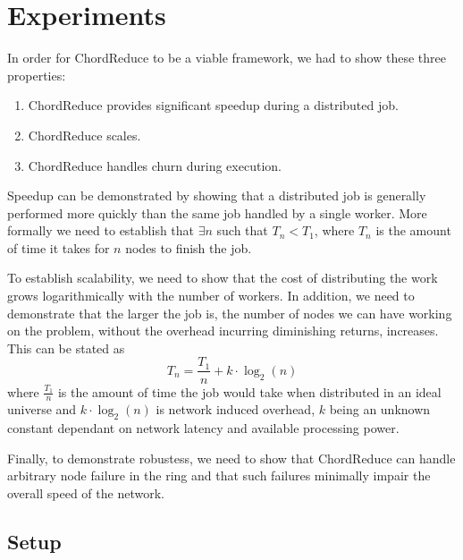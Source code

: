 \documentclass[10pt, conference, compsocconf]{IEEEtran}
\begin{document}


\section{Experiments}
In order for ChordReduce to be a viable framework, we had to show these three properties:
\begin{enumerate}
    \item ChordReduce provides significant speedup during a distributed job.
    \item ChordReduce scales.
    \item ChordReduce handles churn during execution.
\end{enumerate}
Speedup can be demonstrated by showing that a distributed job is generally performed more quickly than the same job handled by a single worker.  More formally we need to establish that $\exists n$ such that $T_{n} < T_{1}$, where $T_{n}$ is the amount of time it takes for $n$ nodes to finish the job.

To establish scalability, we need to show that the cost  of distributing the work grows logarithmically with the number of workers.  In addition, we need to demonstrate that the larger the job is, the number of nodes we can have working on the problem, without the overhead incurring diminishing returns, increases. This can be stated as $$T_{n} = \frac{T_{1}}{n} + k \cdot \log_{2}(n)$$ where $\frac{T_{1}}{n}$ is the amount of time the job would take when distributed in an ideal universe and $k \cdot \log_{2}(n)$ is network induced overhead, $k$ being an unknown constant dependant on network latency and available processing power.

Finally, to demonstrate robustess, we need to show that ChordReduce can handle arbitrary node failure in the ring and that such failures minimally impair the overall speed of the network.

\subsection{Setup}
\end{document}
